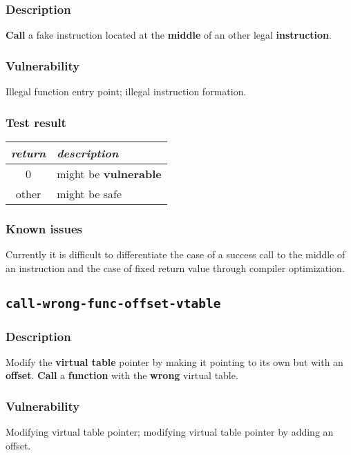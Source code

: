 \documentclass[a4paper]{book}
\begin{document}
\subsubsection{Description}
\textbf{Call} a fake instruction located at the \textbf{middle} of an other legal \textbf{instruction}.

\subsubsection{Vulnerability}
Illegal function entry point; illegal instruction formation.

\subsubsection{Test result}
\begin{tabular}{cl}
  \toprule
  \emph{return}  & \emph{description} \\
  \midrule
  0              & might be \textbf{vulnerable} \\
  other          & might be safe \\
  \bottomrule
\end{tabular}
  
\subsubsection{Known issues}

Currently it is difficult to differentiate the case of a success call to the middle of an instruction
and the case of fixed return value through compiler optimization.


\newpage
\subsection{\texttt{call-wrong-func-offset-vtable}}\label{test-call-wrong-func-offset-vtable}

\subsubsection{Description}
Modify the \textbf{virtual table} pointer by making it pointing to its own but with an \textbf{offset}.
\textbf{Call} a \textbf{function} with the \textbf{wrong} virtual table.

\subsubsection{Vulnerability}
Modifying virtual table pointer; modifying virtual table pointer by adding an offset.
\end{document}
